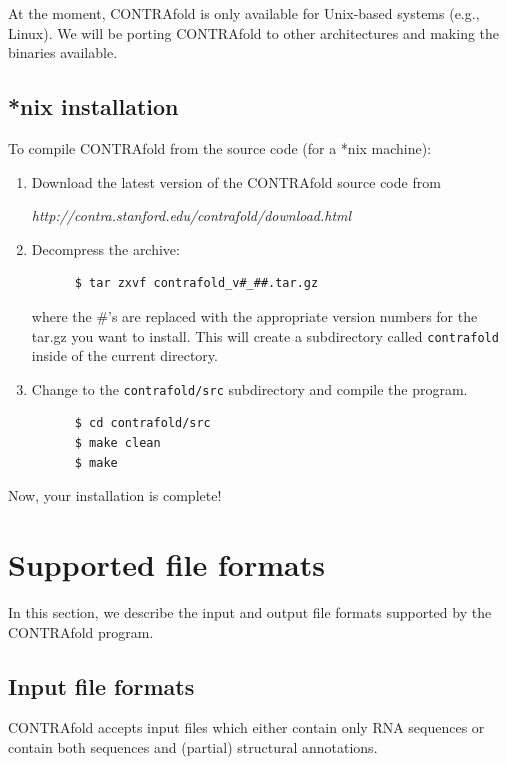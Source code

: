 \documentclass{article}
\begin{document}
  At the moment, CONTRAfold is only available for Unix-based systems
  (e.g., Linux).  We will be porting CONTRAfold to other architectures
  and making the binaries available.

  \subsection{*nix installation}

  To compile CONTRAfold from the source code (for a *nix machine):
  \begin{enumerate}
  \item 
    Download the latest version of the CONTRAfold source code from
    \begin{center}
      \emph{http://contra.stanford.edu/contrafold/download.html}
    \end{center}
  \item
    Decompress the archive:
    \begin{verbatim}
      $ tar zxvf contrafold_v#_##.tar.gz\end{verbatim}
    where the \#'s are replaced with the appropriate version
    numbers for the tar.gz you want to install.  This will create
    a subdirectory called \texttt{contrafold} inside of the current
    directory.
  \item
    Change to the \texttt{contrafold/src} subdirectory and compile the
    program.
    \begin{verbatim}
      $ cd contrafold/src
      $ make clean
      $ make\end{verbatim}
  \end{enumerate}
  Now, your installation is complete!

  \newpage
  \section{Supported file formats}

  In this section, we describe the input and output file formats supported by
  the CONTRAfold program.

  \subsection{Input file formats}
  \label{sec:input-general}
  
  CONTRAfold accepts input files which either contain only RNA
  sequences or contain both sequences and (partial) structural
  annotations.  
  
\end{document}
